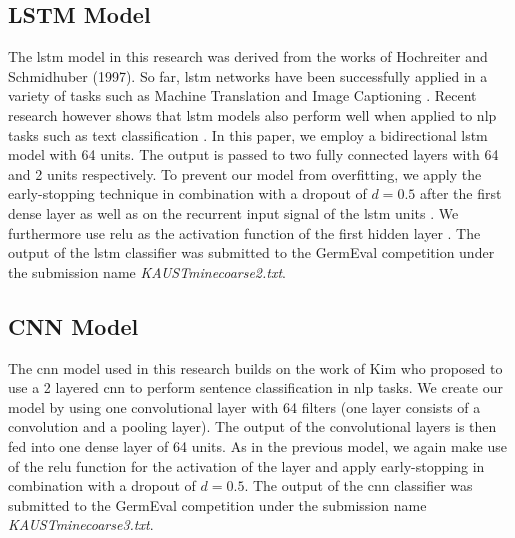 \documentclass[11pt]{article}
\begin{document}
\subsection{LSTM Model}
The \ac{lstm} model in this research was derived from the works of Hochreiter and Schmidhuber (1997). So far, \ac{lstm} networks have been successfully applied in a variety of tasks such as Machine Translation \cite{RN76} and Image Captioning \cite{RN77}. Recent research however shows that \ac{lstm} models also perform well when applied to \ac{nlp} tasks such as text classification \cite{RN57,RN78}.
\newline 
In this paper, we employ a bidirectional \ac{lstm} model with 64 units. The output is passed to two fully connected layers with 64 and 2 units respectively. To prevent our model from overfitting, we  apply the early-stopping technique \cite{RN79} in combination with a dropout of $d=0.5$ after the first dense layer as well as on the recurrent input signal of the \ac{lstm} units \cite{RN66}. We furthermore use \ac{relu} as the activation function of the first hidden layer \cite{RN71,RN72}. 
\newline
The output of the \ac{lstm} classifier was submitted to the GermEval competition under the submission name \textit{KAUSTmine\textunderscore coarse\textunderscore 2.txt}.
\subsection{CNN Model}
The \ac{cnn} model used in this research builds on the work of Kim  who proposed to use a 2 layered \ac{cnn} to perform sentence classification in \ac{nlp} tasks. We create our model by using one convolutional layer with 64 filters (one layer consists of a convolution and a pooling layer). The output of the convolutional layers is then fed into one dense layer of 64 units.  As in the previous model, we again make use of the \ac{relu} function for the activation of the layer and apply early-stopping in combination with a dropout of $d=0.5$. 
\newline
The output of the \ac{cnn} classifier was submitted to the GermEval competition under the submission name \textit{KAUSTmine\textunderscore coarse\textunderscore 3.txt}.
\end{document}
